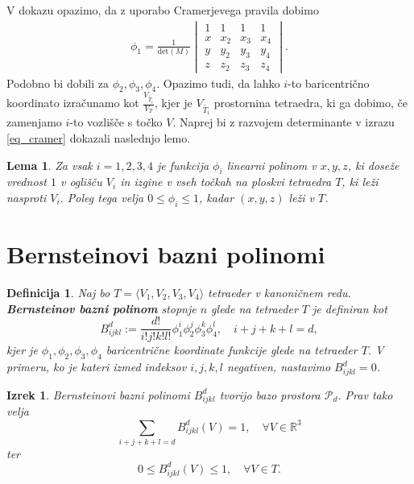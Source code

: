 \documentclass[11pt,a4paper]{article}
\newtheorem{definition}{Definicija}
\newtheorem{lemma}{Lema}
\newtheorem{theorem}{Izrek}
\begin{document}
V dokazu opazimo, da z uporabo Cramerjevega pravila dobimo
\begin{align}\label{eq_cramer}
    \phi_1 = \frac{1}{\text{det}(M)}
    \begin{vmatrix}
        1 & 1 & 1 & 1 \\
        x & x_2 & x_3 & x_4 \\
        y & y_2 & y_3 & y_4 \\
        z & z_2 & z_3 & z_4
    \end{vmatrix}.
\end{align}
Podobno bi dobili za $\phi_2, \phi_3, \phi_4$. 
Opazimo tudi, da lahko $i$-to baricentrično koordinato izračunamo
kot $\frac{V_{\widetilde{T_i}}}{V_T}$, kjer je $V_{\widetilde{T_i}}$
prostornina tetraedra, ki ga dobimo, če zamenjamo $i$-to vozlišče
s točko $V$. 
Naprej bi z razvojem determinante v izrazu \eqref{eq_cramer}
dokazali naslednjo lemo.

\begin{lemma}
    Za vsak $i = 1, 2, 3, 4$ je funkcija $\phi_i$ linearni polinom
    v $x, y, z$, ki doseže vrednost $1$ v oglišču $V_i$ in
    izgine v vseh točkah na ploskvi tetraedra $T$, ki leži
    nasproti $V_i$. Poleg tega velja
    $0 \leq \phi_i \leq 1$, kadar $(x, y, z)$ leži v $T$.
\end{lemma}

\section{Bernsteinovi bazni polinomi}

\begin{definition}
    Naj bo $T = \langle V_1, V_2, V_3, V_4 \rangle$ tetraeder v kanoničnem redu.
    \textbf{Bernsteinov bazni polinom} stopnje $n$ glede na tetraeder $T$ je definiran kot
    \begin{equation}
        B_{ijkl}^d := \frac{d!}{i!j!k!l!} \phi_1^i \phi_2^j \phi_3^k \phi_4^l, \quad i + j + k + l = d,
    \end{equation}
    kjer je $\phi_1, \phi_2, \phi_3, \phi_4$ baricentrične koordinate funkcije
    glede na tetraeder $T$. V primeru, ko je kateri izmed indeksov $i, j, k, l$ negativen, 
    nastavimo $B_{ijkl}^d = 0$.
\end{definition}

\begin{theorem}\label{izrek_bernstein}
    Bernsteinovi bazni polinomi $B_{ijkl}^d$ tvorijo bazo prostora $\mathcal{P}_d$.
    Prav tako velja 
    \begin{equation}\label{eq_partcija_enote}
        \sum_{i+j+k+l = d} B_{ijkl}^d(V) = 1, \quad \forall V \in \mathbb{R}^3     
    \end{equation}
    ter
    \begin{equation}
        0 \leq B_{ijkl}^d(V) \leq 1, \quad \forall V \in T.
    \end{equation}
\end{theorem}
\end{document}
